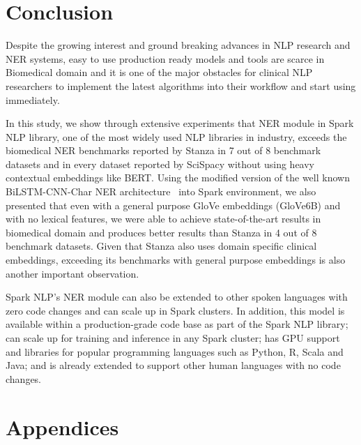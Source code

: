 \documentclass[a4paper,conference]{IEEEtran}
\begin{document}
\section{Conclusion}
\label{sec:conclusion}

Despite the growing interest and ground breaking advances in NLP research and NER systems, easy to use production ready models and tools are scarce in Biomedical domain and it is one of the major obstacles for clinical NLP researchers to implement the latest algorithms into their workflow and start using immediately. 

In this study, we show through extensive experiments that NER module in Spark NLP library, one of the most widely used NLP libraries in industry, exceeds the biomedical NER benchmarks reported by Stanza in 7 out of 8 benchmark datasets and in every dataset reported by SciSpacy without using heavy contextual embeddings like BERT. Using the modified version of the well known BiLSTM-CNN-Char NER architecture~\cite{chiu2016named} into Spark environment, we also presented that even with a general purpose GloVe embeddings (GloVe6B) and with no lexical features, we were able to achieve state-of-the-art results in biomedical domain and produces better results than Stanza in 4 out of 8 benchmark datasets. Given that Stanza also uses domain specific clinical embeddings, exceeding its benchmarks with general purpose embeddings is also another important observation.

Spark NLP's NER module can also be extended to other spoken languages with zero code changes and can scale up in Spark clusters. In addition, this model is available within a production-grade code base as part of the Spark NLP library; can scale up for training and inference in any Spark cluster;  has GPU support and libraries for popular programming languages such as Python, R, Scala and Java; and is already extended to support other human languages with no code changes. 








\appendix

\section{Appendices}
\label{sec:appendix}
\end{document}
